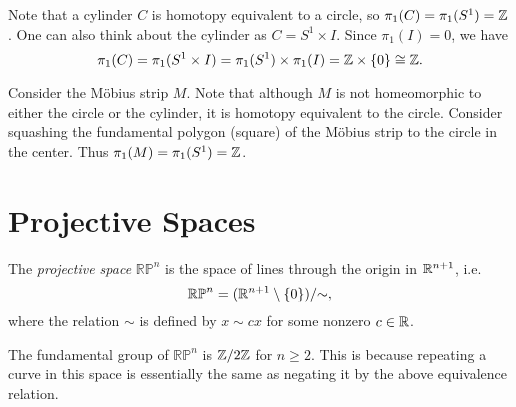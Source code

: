 \begin{example}
  Note that a cylinder $C$ is homotopy equivalent
  to a circle, so $\pi_1(C) = \pi_1(S^1) = \mathbb{Z}$.
  One can also think about the cylinder as
  $C = S^1 \times I$. Since $\pi_1(I) = 0$, we have
  \[
    \pi_1(C) = \pi_1(S^1 \times I) = \pi_1(S^1) \times \pi_1(I) = \mathbb{Z} \times \{0\} \cong \mathbb{Z}.
  \]
\end{example}

\begin{example}
  Consider the M\"obius strip $M$. Note that
  although $M$ is not homeomorphic to either the
  circle or the cylinder, it is homotopy equivalent
  to the circle. Consider squashing the
  fundamental polygon (square) of the M\"obius strip
  to the circle in the center.
  Thus $\pi_1(M) = \pi_1(S^1) = \mathbb{Z}$.
\end{example}

\section{Projective Spaces}
\begin{definition}
  The \emph{projective space} $\mathbb{RP}^n$ is
  the space of lines through the origin in
  $\mathbb{R}^{n + 1}$, i.e.
  \[
    \mathbb{RP}^n = (\mathbb{R}^{n + 1} \setminus \{0\}) / {\sim},
  \]
  where the relation $\sim$ is defined
  by $x \sim cx$ for some nonzero $c \in \mathbb{R}$.
\end{definition}

\begin{remark}
  The fundamental group of
  $\mathbb{RP}^n$ is $\mathbb{Z}/2\mathbb{Z}$ for $n \ge 2$.
  This is because repeating a curve in this
  space is essentially
  the same as negating it by the above equivalence
  relation.
\end{remark}
